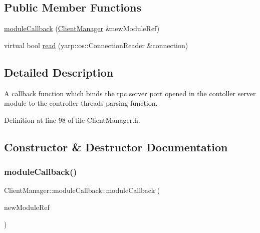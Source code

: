 \subsection*{Public Member Functions}
\begin{DoxyCompactItemize}
\item 
\hyperlink{classocra__recipes_1_1ClientManager_1_1moduleCallback_a9c5241da8148f501d1947053fe06ebdb}{module\+Callback} (\hyperlink{classocra__recipes_1_1ClientManager}{Client\+Manager} \&new\+Module\+Ref)
\item 
virtual bool \hyperlink{classocra__recipes_1_1ClientManager_1_1moduleCallback_a728d0037e1552bf3ca6152d6b638f30c}{read} (yarp\+::os\+::\+Connection\+Reader \&connection)
\end{DoxyCompactItemize}


\subsection{Detailed Description}
A callback function which binds the rpc server port opened in the contoller server module to the controller thread\textquotesingle{}s parsing function. 

Definition at line 98 of file Client\+Manager.\+h.



\subsection{Constructor \& Destructor Documentation}
\hypertarget{classocra__recipes_1_1ClientManager_1_1moduleCallback_a9c5241da8148f501d1947053fe06ebdb}{}\label{classocra__recipes_1_1ClientManager_1_1moduleCallback_a9c5241da8148f501d1947053fe06ebdb} 
\subsubsection{\texorpdfstring{module\+Callback()}{moduleCallback()}}
{\footnotesize\ttfamily Client\+Manager\+::module\+Callback\+::module\+Callback (\begin{DoxyParamCaption}\item[{\hyperlink{classocra__recipes_1_1ClientManager}{Client\+Manager} \&}]{new\+Module\+Ref }\end{DoxyParamCaption})}


